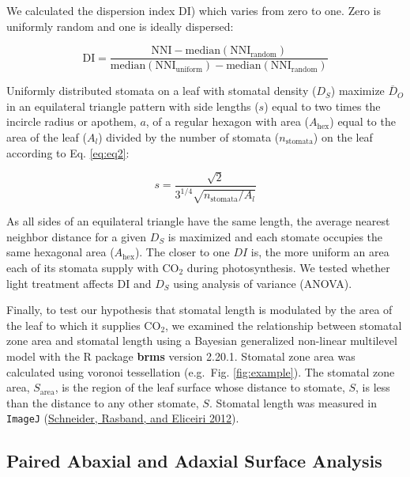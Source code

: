 \documentclass[12pt,halfline,a4paper,]{ouparticle}
\begin{document}
We calculated the dispersion index \(\mathrm{DI}\)) which varies from
zero to one. Zero is uniformly random and one is ideally dispersed:

\begin{equation}\label{eq:disp}
  \mathrm{DI} = \frac{\mathrm{NNI} - \text{median}(\mathrm{NNI_{random}})}{\text{median}(\mathrm{NNI_{uniform}}) - \text{median}(\mathrm{NNI_{random}})}
\end{equation}

Uniformly distributed stomata on a leaf with stomatal density (\(D_S\))
maximize \(\overline{D}_O\) in an equilateral triangle pattern with side
lengths (\(s\)) equal to two times the incircle radius or apothem,
\(a\), of a regular hexagon with area (\(A_\text{hex}\)) equal to the
area of the leaf (\(A_l\)) divided by the number of stomata
(\(n_\text{stomata}\)) on the leaf according to Eq. \ref{eq:eq2}:

\begin{equation}\label{eq:eq2}
  s = \frac{\sqrt{2}} {3^{1/4} \sqrt{n_\text{stomata} / A_l}}
\end{equation}

As all sides of an equilateral triangle have the same length, the
average nearest neighbor distance for a given \(D_S\) is maximized and
each stomate occupies the same hexagonal area (\(A_\text{hex}\)). The
closer to one \(DI\) is, the more uniform an area each of its stomata
supply with CO\(_2\) during photosynthesis. We tested whether light
treatment affects \(\mathrm{DI}\) and \(D_S\) using analysis of variance
(ANOVA).

Finally, to test our hypothesis that stomatal length is modulated by the
area of the leaf to which it supplies CO\(_2\), we examined the
relationship between stomatal zone area and stomatal length using a
Bayesian generalized non-linear multilevel model with the R package
\textbf{brms} version 2.20.1. Stomatal zone area was calculated using
voronoi tessellation (e.g.~Fig. \ref{fig:example}). The stomatal zone
area, \(S_\text{area}\), is the region of the leaf surface whose
distance to stomate, \(S\), is less than the distance to any other
stomate, \(S\). Stomatal length was measured in \texttt{ImageJ}
(\protect\hyperlink{ref-schneider_nih_2012}{Schneider, Rasband, and
Eliceiri 2012}).

\hypertarget{paired-abaxial-and-adaxial-surface-analysis}{%
\subsection{Paired Abaxial and Adaxial Surface
Analysis}\label{paired-abaxial-and-adaxial-surface-analysis}}
\end{document}
